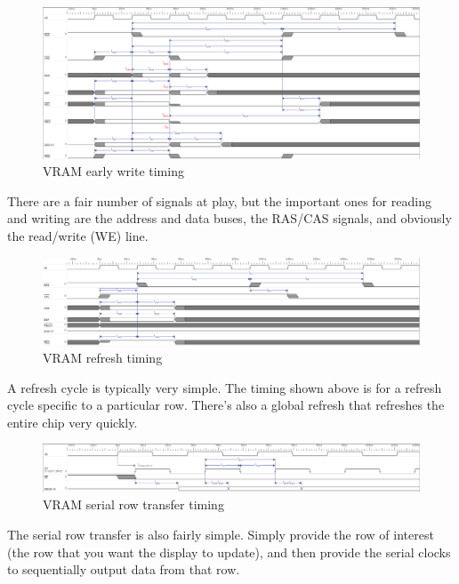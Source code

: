 \begin{figure}[ht!]
    \centering
    \includegraphics[width=6in]{Timing/FPGA-Oscilloscope-VRAM-WRITE-EARLY.png}
		\caption{VRAM early write timing}
\end{figure}

There are a fair number of signals at play, but the important ones for reading and writing are the address and data buses, the RAS/CAS signals, and obviously the read/write (WE) line.

\begin{figure}[ht!]
    \centering
    \includegraphics[width=6in]{Timing/FPGA-Oscilloscope-VRAM-REFRESH.png}
		\caption{VRAM refresh timing}
\end{figure}

A refresh cycle is typically very simple. The timing shown above is for a refresh cycle specific to a particular row. There's also a global refresh that refreshes the entire chip very quickly.

\begin{figure}[ht!]
    \centering
    \includegraphics[width=6in]{Timing/FPGA-Oscilloscope-VRAM-SERIAL-READ.png}
		\caption{VRAM serial row transfer timing}
\end{figure}

The serial row transfer is also fairly simple. Simply provide the row of interest (the row that you want the display to update), and then provide the serial clocks to sequentially output data from that row.

